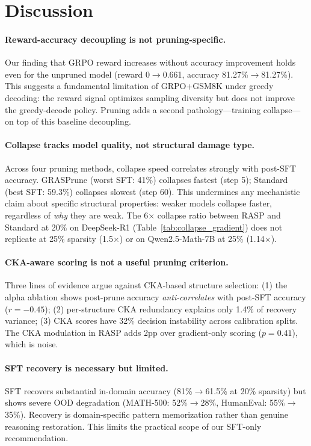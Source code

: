 \documentclass[11pt,a4paper]{article}
\begin{document}
\section{Discussion}
\label{sec:discussion}

\paragraph{Reward-accuracy decoupling is not pruning-specific.}
Our finding that GRPO reward increases without accuracy improvement holds even for the unpruned model (reward 0$\to$0.661, accuracy 81.27\%$\to$81.27\%). This suggests a fundamental limitation of GRPO+GSM8K under greedy decoding: the reward signal optimizes sampling diversity but does not improve the greedy-decode policy. Pruning adds a second pathology---training collapse---on top of this baseline decoupling.

\paragraph{Collapse tracks model quality, not structural damage type.}
Across four pruning methods, collapse speed correlates strongly with post-SFT accuracy. GRASPrune (worst SFT: 41\%) collapses fastest (step 5); Standard (best SFT: 59.3\%) collapses slowest (step 60). This undermines any mechanistic claim about specific structural properties: weaker models collapse faster, regardless of \emph{why} they are weak. The 6$\times$ collapse ratio between RASP and Standard at 20\% on DeepSeek-R1 (Table~\ref{tab:collapse_gradient}) does not replicate at 25\% sparsity (1.5$\times$) or on Qwen2.5-Math-7B at 25\% (1.14$\times$).

\paragraph{CKA-aware scoring is not a useful pruning criterion.}
Three lines of evidence argue against CKA-based structure selection: (1) the alpha ablation shows post-prune accuracy \emph{anti-correlates} with post-SFT accuracy ($r=-0.45$); (2) per-structure CKA redundancy explains only 1.4\% of recovery variance; (3) CKA scores have 32\% decision instability across calibration splits. The CKA modulation in RASP adds 2pp over gradient-only scoring ($p=0.41$), which is noise.

\paragraph{SFT recovery is necessary but limited.}
SFT recovers substantial in-domain accuracy (81\%$\to$61.5\% at 20\% sparsity) but shows severe OOD degradation (MATH-500: 52\%$\to$28\%, HumanEval: 55\%$\to$35\%). Recovery is domain-specific pattern memorization rather than genuine reasoning restoration. This limits the practical scope of our SFT-only recommendation.
\end{document}

